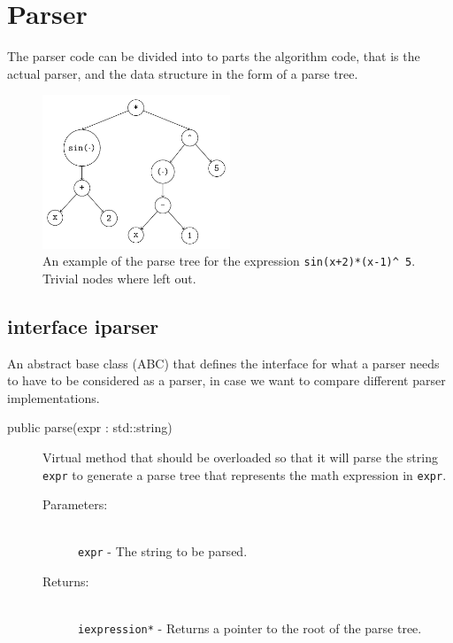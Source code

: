 \documentclass[a4paper,11pt]{kth-mag}
\begin{document}
\section{Parser}
The parser code can be divided into to parts the algorithm code, that is the 
actual parser, and the data structure in the form of a parse tree. 

\begin{figure}[ht]
\begin{center}
    \includegraphics[width=0.5\textwidth]{parse-tree.pdf}
    \caption{\small{
        An example of the parse tree for the
        expression \texttt{sin(x+2)*(x-1)}\texttt{\^~}\!\!\texttt{5}.
        Trivial nodes where left out.
    }}
   \label{fig:parsetree}
\end{center}
\end{figure}


\subsection{interface iparser}
An abstract base class (ABC) that defines the interface for what a parser 
needs to have to be considered as a parser, in case
we want to compare different parser implementations.
\begin{description}
    \item[public parse(expr : std::string)] Virtual method that should be
    overloaded so that it will parse the string \texttt{expr} to
    generate a parse tree that represents the math expression in \texttt{expr}.
    \begin{description}
            \item[Parameters:]~\\
                \verb+expr+ - The string to be parsed.
            \item[Returns:]~\\
                \verb+iexpression*+ - Returns a pointer to the root of the
                parse tree.
        \end{description}
\end{description}
\end{document}
